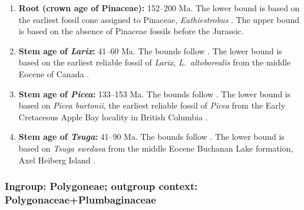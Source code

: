 \begin{enumerate}
\item \textbf{Root (crown age of Pinaceae):} 152--200 Ma. The lower
  bound is based on the earliest fossil cone assigned to Pinaceae,
  \textit{Eathiestrobus} \citep{Rothwell2012}. The upper bound is
  based on the absence of Pinaceae fossils before the
  Jurassic.%

\item \textbf{Stem age of \textit{Larix}:} 41--60 Ma. The bounds
  follow \citet{Leslie2012}. The lower bound is based on the earliest
  reliable fossil of \textit{Larix}, \textit{L.~altoborealis} from the
  middle Eocene of Canada \citep{LePage1991}.

\item \textbf{Stem age of \textit{Picea}:} 133--153 Ma. The bounds
  follow \citet{Leslie2012}. The lower bound is based on \textit{Picea
    burtonii}, the earliest reliable fossil of \textit{Picea} from the
  Early Cretaceous Apple Bay locality in British Columbia
  \citep{Klymiuk2012}.

\item \textbf{Stem age of \textit{Tsuga}:} 41--90 Ma. The bounds
  follow \citet{Leslie2012}. The lower bound is based on \textit{Tsuga
    swedaea} from the middle Eocene Buchanan Lake formation, Axel
  Heiberg Island \citep{Lepage2003}.

\end{enumerate}

\subsubsection*{Ingroup: Polygoneae; outgroup context:
  Polygonaceae+Plumbaginaceae}

